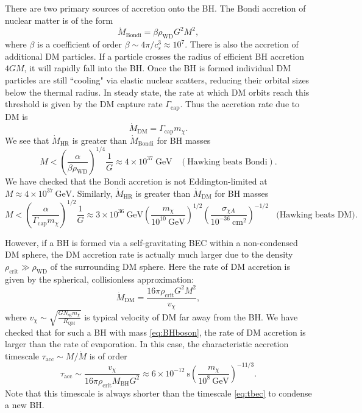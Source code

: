 \documentclass[preprintnumbers,amsmath,amssymb,prd,superscriptaddress]{revtex4}
\newcommand{\GeV}{\text{GeV}}
\newcommand{\cm}{\text{cm}}
\def\r{\right)}
\def\l{\left(}
\begin{document}
There are two primary sources of accretion onto the BH.
The Bondi accretion of nuclear matter is of the form
\begin{equation}
\dot{M}_\text{Bondi} = \beta \rho_\text{WD} G^2 M^2,
\end{equation}    
where $\beta$ is a coefficient of order $\beta \sim 4 \pi/c_s^3 \approx 10^7$. 
There is also the accretion of additional DM particles.
If a particle crosses the radius of efficient BH accretion $4GM$, it will rapidly fall into the BH. 
Once the BH is formed individual DM particles are still ``cooling" via elastic nuclear scatters, reducing their orbital sizes below the thermal radius. 
In steady state, the rate at which DM orbits reach this threshold is given by the DM capture rate $\Gamma_\text{cap}$. 
Thus the accretion rate due to DM is 
\begin{equation}
\dot{M}_\text{DM} = \Gamma_\text{cap} m_\chi. 
\end{equation}
We see that $\dot{M}_\text{HR}$ is greater than $\dot{M}_\text{Bondi}$ for BH masses
\begin{equation}
\label{eq:beatbondi}
M < \l \frac{\alpha}{\beta \rho_\text{WD}}\r^{1/4} \frac{1}{G} \approx 4 \times 10^{37} ~\GeV ~~~~ (\text{Hawking beats Bondi}).
\end{equation}
We have checked that the Bondi accretion is not Eddington-limited at $M \approx 4 \times 10^{37} ~\GeV$. 
Similarly, $\dot{M}_\text{HR}$ is greater than $\dot{M}_\text{DM}$ for BH masses
\begin{equation}
\label{eq:beatDM}
M < \l \frac{\alpha}{\Gamma_\text{cap} m_\chi}\r^{1/2} \frac{1}{G} \approx 3 \times 10^{36} ~\GeV \l \frac{m_\chi}{10^{10} ~\GeV} \r^{1/2} \l \frac{\sigma_{\chi A}}{10^{-36} ~\cm^2} \r^{-1/2}~~~~ \text{(Hawking beats DM}). 
\end{equation}

However, if a BH is formed via a self-gravitating BEC within a non-condensed DM sphere, the DM accretion rate is actually much larger due to the density $\rho_\text{crit} \gg \rho_\text{WD}$ of the surrounding DM sphere.
Here the rate of DM accretion is given by the spherical, collisionless approximation:
\begin{equation}
\dot{M}_\text{DM} = \frac{16 \pi \rho_\text{crit} G^2 M^2}{v_\chi},
\end{equation}
where $v_\chi \sim \sqrt{\frac{G N_\text{sg} m_\chi}{R_\text{QM}}}$ is typical velocity of DM far away from the BH. 
We have checked that for such a BH with mass \eqref{eq:BHboson}, the rate of DM accretion is larger than the rate of evaporation. 
In this case, the characteristic accretion timescale $\tau_\text{acc} \sim M/\dot{M}$ is of order
\begin{equation}
\tau_\text{acc} \sim \frac{v_\chi}{16 \pi \rho_\text{crit} M_\text{BH} G^2} \approx 6 \times 10^{-12} ~\text{s} \l \frac{m_\chi}{10^{8} ~\GeV} \r^{-11/3}.
\end{equation}
Note that this timescale is always shorter than the timescale \eqref{eq:tbec} to condense a new BH. 
\end{document}
